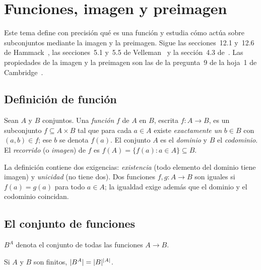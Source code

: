 \chapter{Funciones, imagen y preimagen}
\label{tema:2}

Este tema define con precisión qué es una función y estudia cómo actúa sobre subconjuntos mediante la imagen y la preimagen. Sigue las secciones~12.1 y~12.6 de Hammack~\cite{hammack}, las secciones~5.1 y~5.5 de Velleman~\cite{velleman} y la sección~4.3 de~\cite{mcs}. Las propiedades de la imagen y la preimagen son las de la pregunta~9 de la hoja~1 de Cambridge~\cite{camns}.

\section{Definición de función}

\begin{definicion}[Función]\label{def:t2-funcion}
Sean $A$ y $B$ conjuntos. Una \emph{función} $f$ de $A$ en $B$, escrita $f\colon A\to B$, es un subconjunto $f\subseteq A\times B$ tal que para cada $a\in A$ existe \emph{exactamente un} $b\in B$ con $(a,b)\in f$; ese $b$ se denota $f(a)$. El conjunto $A$ es el \emph{dominio} y $B$ el \emph{codominio}. El \emph{recorrido} (o \emph{imagen}) de $f$ es $f(A)=\{f(a): a\in A\}\subseteq B$.
\end{definicion}

La definición contiene dos exigencias: \emph{existencia} (todo elemento del dominio tiene imagen) y \emph{unicidad} (no tiene dos). Dos funciones $f,g\colon A\to B$ son iguales si $f(a)=g(a)$ para todo $a\in A$; la igualdad exige además que el dominio y el codominio coincidan.

\addtocounter{definicion}{1}%

\addtocounter{definicion}{1}%

\section{El conjunto de funciones}

\begin{definicion}
$B^{A}$ denota el conjunto de todas las funciones $A\to B$.
\end{definicion}

\begin{proposicion}\label{prop:t2-contar}
Si $A$ y $B$ son finitos, $\lvert B^{A}\rvert=\lvert B\rvert^{\lvert A\rvert}$.
\end{proposicion}

